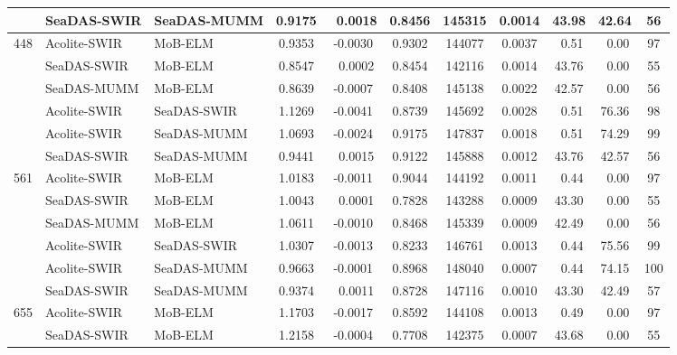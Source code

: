 \documentclass[draft]{spie}  %
\begin{document}
\begin{table}[!ht]
\begin{tabular}{cllcccccccc}
			&   SeaDAS-SWIR   &  SeaDAS-MUMM  &	0.9175 	&	~0.0018 &	0.8456 	&	145315  &	0.0014  &  43.98    	& 42.64     		   &   56   	 \\  \hline
\multirow{6}{*}{448}&Acolite-SWIR&MoB-ELM     &	0.9353 	&	-0.0030 &	0.9302 	&	144077  &	0.0037  &  ~0.51     	& ~0.00      		   &   97   	 \\
			&   SeaDAS-SWIR   &  MoB-ELM      &	0.8547 	&	~0.0002 &	0.8454 	&	142116  &	0.0014  &  43.76    	& ~0.00      		   &   55   	 \\
			&   SeaDAS-MUMM   &  MoB-ELM      &	0.8639 	&	-0.0007 &	0.8408 	&	145138  &	0.0022  &  42.57    	& ~0.00      		   &   56   	 \\ 
			&   Acolite-SWIR  &  SeaDAS-SWIR  &	1.1269 	&	-0.0041 &	0.8739 	&	145692  &	0.0028  &  ~0.51     	& 76.36     		   &   98   	 \\
			&   Acolite-SWIR  &  SeaDAS-MUMM  &	1.0693 	&	-0.0024 &	0.9175 	&	147837  &	0.0018  &  ~0.51     	& 74.29     		   &   99   	 \\
			&   SeaDAS-SWIR   &  SeaDAS-MUMM  &	0.9441 	&	~0.0015 &	0.9122 	&	145888  &	0.0012  &  43.76    	& 42.57     		   &   56   	 \\ \hline
\multirow{6}{*}{561}&Acolite-SWIR&  MoB-ELM   &	1.0183 	&	-0.0011 &	0.9044 	&	144192  &	0.0011  &  ~0.44     	& ~0.00      		   &   97   	 \\
	 		&   SeaDAS-SWIR   &  MoB-ELM      &	1.0043 	&	~0.0001 &	0.7828 	&	143288  &	0.0009  &  43.30    	& ~0.00      		   &   55   	 \\
	 		&   SeaDAS-MUMM   &  MoB-ELM      &	1.0611 	&	-0.0010 &	0.8468 	&	145339  &	0.0009  &  42.49    	& ~0.00      		   &   56   	 \\
	 		&   Acolite-SWIR  &  SeaDAS-SWIR  &	1.0307 	&	-0.0013 &	0.8233 	&	146761  &	0.0013  &  ~0.44     	& 75.56     		   &   99   	 \\
	 		&   Acolite-SWIR  &  SeaDAS-MUMM  &	0.9663 	&	-0.0001 &	0.8968 	&	148040  &	0.0007  &  ~0.44     	& 74.15     		   &   100  	 \\
	  		&   SeaDAS-SWIR   &  SeaDAS-MUMM  &	0.9374 	&	~0.0011 &	0.8728 	&	147116  &	0.0010  &  43.30    	& 42.49     		   &   57   	 \\ \hline
\multirow{6}{*}{655}&Acolite-SWIR&MoB-ELM     &	1.1703 	&	-0.0017 &	0.8592 	&	144108  &	0.0013  &  ~0.49     	& ~0.00      		   &   97   	 \\
	 		&   SeaDAS-SWIR   &  MoB-ELM      &	1.2158 	&	-0.0004 &	0.7708 	&	142375  &	0.0007  &  43.68    	& ~0.00      		   &   55   	 \\

\end{tabular}
\end{table}
\end{document}
